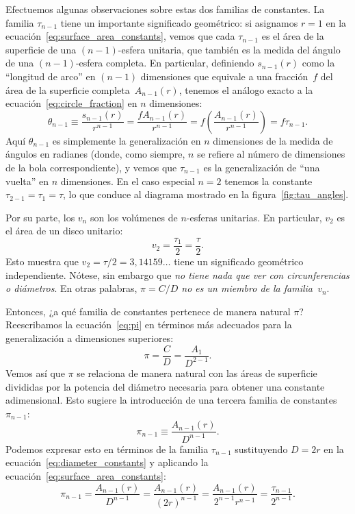 Efectuemos algunas observaciones sobre estas dos familias de constantes. La familia $\tau_{n-1}$ tiene un importante significado geométrico: si asignamos $r=1$ en la ecuación~\eqref{eq:surface_area_constants}, vemos que cada $\tau_{n-1}$ es el área de la superficie de una $(n-1)$-esfera unitaria, que también es la medida del ángulo de una $(n-1)$-esfera completa. En particular, definiendo $s_{n-1}(r)$ como la ``longitud de arco'' en $(n-1)$ dimensiones que equivale a una fracción~$f$ del área de la superficie completa~$A_{n-1}(r)$, tenemos el análogo exacto a la ecuación~\eqref{eq:circle_fraction} en $n$ dimensiones:
\[
\theta_{n-1} \equiv \frac{s_{n-1}(r)}{r^{n-1}} = \frac{f A_{n-1}(r)}{r^{n-1}} = f\left(\frac{A_{n-1}(r)}{r^{n-1}}\right) = f\tau_{n-1}.
\]
Aquí $\theta_{n-1}$ es simplemente la generalización en $n$ dimensiones de la medida de ángulos en radianes (donde, como siempre, $n$ se refiere al número de dimensiones de la bola correspondiente), y vemos que $\tau_{n-1}$ es la generalización de ``una vuelta'' en $n$ dimensiones. En el caso especial $n=2$ tenemos la constante $\tau_{2-1} = \tau_1 = \tau$, lo que conduce al diagrama mostrado en la figura~\ref{fig:tau_angles}. 

Por su parte, los $v_n$ son los volúmenes de $n$-esferas unitarias. En particular, $v_2$ es el área de un disco unitario:
\[
v_2 = \frac{\tau_1}{2} = \frac{\tau}{2}.
\]
Esto muestra que $v_2 = \tau/2 = 3{,}14159\ldots$ tiene un significado geométrico independiente. Nótese, sin embargo que \emph{no tiene nada que ver con circunferencias o diámetros}. En otras palabras, \emph{$\pi = C/D$ no es un miembro de la familia~$v_n$}.

Entonces, ¿a qué familia de constantes pertenece de manera natural $\pi$?
Reescribamos la ecuación~\eqref{eq:pi} en términos más adecuados para la generalización a dimensiones superiores:
\[
\pi = \frac{C}{D} = \frac{A_1}{D^{2-1}}.
\]
Vemos así que $\pi$ se relaciona de manera natural con las áreas de superficie divididas por la potencia del diámetro necesaria para obtener una constante adimensional. Esto sugiere la introducción de una tercera familia de constantes~$\pi_{n-1}$:
\begin{equation}
\label{eq:diameter_constants}
\pi_{n-1} \equiv \frac{A_{n-1}(r)}{D^{n-1}}.
\end{equation}
Podemos expresar esto en términos de la familia $\tau_{n-1}$ sustituyendo $D = 2r$ en la ecuación~\eqref{eq:diameter_constants} y aplicando la ecuación~\eqref{eq:surface_area_constants}:
\[
\pi_{n-1} = \frac{A_{n-1}(r)}{D^{n-1}} = \frac{A_{n-1}(r)}{(2r)^{n-1}} =
\frac{A_{n-1}(r)}{2^{n-1}r^{n-1}} = \frac{\tau_{n-1}}{2^{n-1}}.
\]

